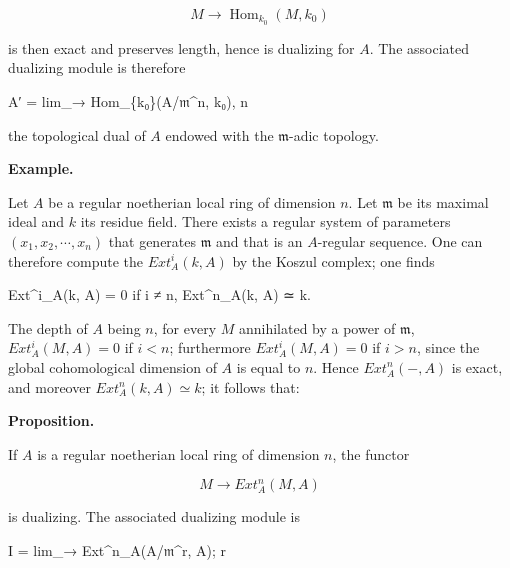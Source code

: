 \documentclass[
  11pt,
  a4paper,
]{book}
\newenvironment{Shaded}{}{}
\newcommand{\NormalTok}[1]{#1}
\begin{document}
\[ M \longrightarrow \operatorname{Hom}_{k_{0}}(M, k_{0}) \]

is then exact and preserves length, hence is dualizing for \(A\). The
associated dualizing module is therefore

\begin{Shaded}
\begin{Highlighting}[]
\NormalTok{A′ = lim\_→ Hom\_\{k₀\}(A/𝔪\^{}n, k₀),}
\NormalTok{       n}
\end{Highlighting}
\end{Shaded}

the topological dual of \(A\) endowed with the \(\mathfrak{m}\)-adic
topology.

\textbf{Example.}

Let \(A\) be a regular noetherian local ring of dimension \(n\). Let
\(\mathfrak{m}\) be its maximal ideal and \(k\) its residue field. There
exists a regular system of parameters \((x_{1}, x_{2}, \cdots, x_{n})\)
that generates \(\mathfrak{m}\) and that is an \(A\)-regular sequence.
One can therefore compute the \(Ext^{i}_{A}(k, A)\) by the Koszul
complex; one finds

\begin{Shaded}
\begin{Highlighting}[]
\NormalTok{Ext\^{}i\_A(k, A) = 0    if i ≠ n,}
\NormalTok{Ext\^{}n\_A(k, A) ≃ k.}
\end{Highlighting}
\end{Shaded}

The depth of \(A\) being \(n\), for every \(M\) annihilated by a power
of \(\mathfrak{m}\), \(Ext^{i}_{A}(M, A) = 0\) if \(i < n\); furthermore
\(Ext^{i}_{A}(M, A) = 0\) if \(i > n\), since the global cohomological
dimension of \(A\) is equal to \(n\). Hence \(Ext^{n}_{A}(-, A)\) is
exact, and moreover \(Ext^{n}_{A}(k, A) \simeq k\); it follows that:

\textbf{Proposition.}

If \(A\) is a regular noetherian local ring of dimension \(n\), the
functor

\[ M \longrightarrow Ext^{n}_{A}(M, A) \]

is dualizing. The associated dualizing module is

\begin{Shaded}
\begin{Highlighting}[]
\NormalTok{I = lim\_→ Ext\^{}n\_A(A/𝔪\^{}r, A);}
\NormalTok{      r}
\end{Highlighting}
\end{Shaded}
\end{document}

